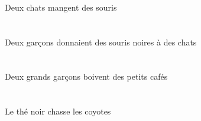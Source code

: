 \begin{exe}
\ex\glll
\INDDuErg{}   \chatDDuErg{}   \INDPlAbs{}   \sourisAPlAbs{}  \mangerVtPrsAPl{}\\
\INDDuErgP{}   \chatDDuErgP{}   \INDPlAbsP{}   \sourisAPlAbsP{}  \mangerVtPrsAPlP{}\\
\INDDuErgG{}   \chatDDuErgG{}   \INDPlAbsG{}   \sourisAPlAbsG{}  \mangerVtPrsAPlG{}\\
Deux chats mangent des souris
\ex\glll
\INDDuErg{}   \garconBDuErg{}    \INDPlDat{}   \chatDPlDat{}   \INDPlAbs{}   \noirAPl{}   \sourisAPlAbs{}  \donnerVdPstAPl{}\\
\INDDuErgP{}   \garconBDuErgP{}    \INDPlDatP{}   \chatDPlDatP{}   \INDPlAbsP{}   \noirAPlP{}   \sourisAPlAbsP{}  \donnerVdPstAPlP{}\\
\INDDuErgG{}   \garconBDuErgG{}    \INDPlDatG{}   \chatDPlDatG{}   \INDPlAbsG{}   \noirAPlG{}   \sourisAPlAbsG{}  \donnerVdPstAPlG{}\\
Deux garçons donnaient des souris noires à des chats
\ex\glll
\INDDuErg{}   \grandBDu{}   \garconBDuErg{}   \INDPlAbs{}   \petitDPl{}   \cafeDPlAbs{}  \boireVtPrsDPl{}\\
\INDDuErgP{}   \grandBDuP{}   \garconBDuErgP{}   \INDPlAbsP{}   \petitDPlP{}   \cafeDPlAbsP{}  \boireVtPrsDPlP{}\\
\INDDuErgG{}   \grandBDuG{}   \garconBDuErgG{}   \INDPlAbsG{}   \petitDPlG{}   \cafeDPlAbsG{}  \boireVtPrsDPlG{}\\
Deux grands garçons boivent des petits cafés
\ex\glll
\DEFSgErg{}   \noirBSg{}   \theBSgErg{}   \DEFPlAbs{}   \coyoteAPlAbs{}  \chasserVtPrsAPl{}\\
\DEFSgErgP{}   \noirBSgP{}   \theBSgErgP{}   \DEFPlAbsP{}   \coyoteAPlAbsP{}  \chasserVtPrsAPlP{}\\
\DEFSgErgG{}   \noirBSgG{}   \theBSgErgG{}   \DEFPlAbsG{}   \coyoteAPlAbsG{}  \chasserVtPrsAPlG{}\\
Le thé noir chasse les coyotes
\ex\glll
\DEMPlErg{}   \troisCPl{}   \chasseurCPlErg{}    \DEFSgDat{}   \petitBSg{}   \blancBSg{}   \garconBSgDat{}   \INDDuAbs{}    \DEFPlObl{}   \plaineCPlObl{}   \DE{}   \autrucheDDuAbs{}  \offrirVdPstDDu{}\\
\DEMPlErgP{}   \troisCPlP{}   \chasseurCPlErgP{}    \DEFSgDatP{}   \petitBSgP{}   \blancBSgP{}   \garconBSgDatP{}   \INDDuAbsP{}    \DEFPlOblP{}   \plaineCPlOblP{}   \DEP{}   \autrucheDDuAbsP{}  \offrirVdPstDDuP{}\\
\DEMPlErgG{}   \troisCPlG{}   \chasseurCPlErgG{}    \DEFSgDatG{}   \petitBSgG{}   \blancBSgG{}   \garconBSgDatG{}   \INDDuAbsG{}    \DEFPlOblG{}   \plaineCPlOblG{}   \DEG{}   \autrucheDDuAbsG{}  \offrirVdPstDDuG{}\\

\end{exe}
